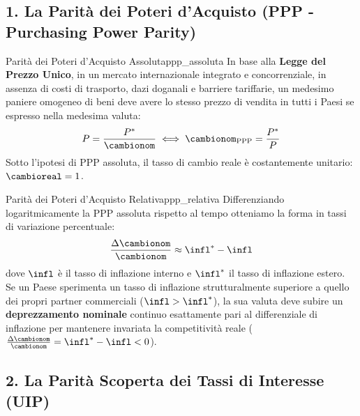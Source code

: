 \subsection{1. La Parità dei Poteri d'Acquisto (PPP - Purchasing Power Parity)}

\begin{teorema}{Parità dei Poteri d'Acquisto Assoluta}{ppp_assoluta}
In base alla \textbf{Legge del Prezzo Unico}, in un mercato internazionale integrato e concorrenziale, in assenza di costi di trasporto, dazi doganali e barriere tariffarie, un medesimo paniere omogeneo di beni deve avere lo stesso prezzo di vendita in tutti i Paesi se espresso nella medesima valuta:
\begin{equation}
    P = \frac{P^*}{\cambionom} \iff \cambionom_{\text{PPP}} = \frac{P^*}{P} \label{eq:ppp_assoluta}
\end{equation}
Sotto l'ipotesi di PPP assoluta, il tasso di cambio reale è costantemente unitario: $\cambioreal = 1$.
\end{teorema}

\begin{teorema}{Parità dei Poteri d'Acquisto Relativa}{ppp_relativa}
Differenziando logaritmicamente la PPP assoluta rispetto al tempo otteniamo la forma in tassi di variazione percentuale:
\begin{equation}
    \frac{\Delta \cambionom}{\cambionom} \approx \infl^* - \infl \label{eq:ppp_relativa}
\end{equation}
dove $\infl$ è il tasso di inflazione interno e $\infl^*$ il tasso di inflazione estero.
Se un Paese sperimenta un tasso di inflazione strutturalmente superiore a quello dei propri partner commerciali ($\infl > \infl^*$), la sua valuta deve subire un \textbf{deprezzamento nominale} continuo esattamente pari al differenziale di inflazione per mantenere invariata la competitività reale ($\frac{\Delta \cambionom}{\cambionom} = \infl^* - \infl < 0$).
\end{teorema}

\subsection{2. La Parità Scoperta dei Tassi di Interesse (UIP)}


